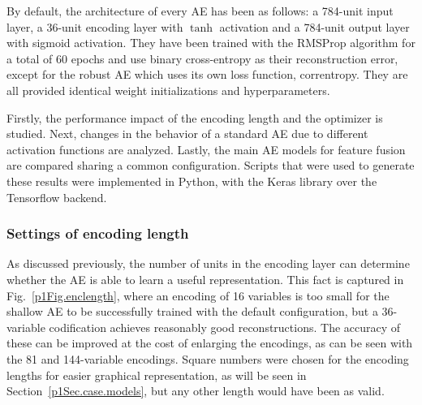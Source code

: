 By default, the architecture of every AE has been as follows: a 784-unit input layer, a 36-unit encoding layer with $\tanh$ activation and a 784-unit output layer with sigmoid activation. They have been trained with the RMSProp algorithm for a total of 60 epochs and use binary cross-entropy as their reconstruction error, except for the robust AE which uses its own loss function, correntropy. They are all provided identical weight initializations  and hyperparameters.

Firstly, the performance impact of the encoding length and the optimizer  is studied. Next, changes in the behavior of a standard AE due to different activation functions are analyzed. Lastly, the main AE models for feature fusion are compared sharing a common configuration. Scripts that were used to generate these results were implemented in Python, with the Keras library over the Tensorflow backend.

\subsubsection{Settings of encoding length}
As discussed previously, the number of units in the encoding layer can determine whether the AE is able to learn a useful representation. This fact is captured in Fig.~\ref{p1Fig.enclength}, where an encoding of 16 variables is too small for the shallow AE to be successfully trained with the default configuration, but a 36-variable codification achieves reasonably good reconstructions. The accuracy of these can be improved at the cost of enlarging the encodings, as can be seen with the 81 and 144-variable encodings. Square numbers were chosen for the encoding lengths for easier graphical representation, as will be seen in Section~\ref{p1Sec.case.models}, but any other length would have been as valid.

